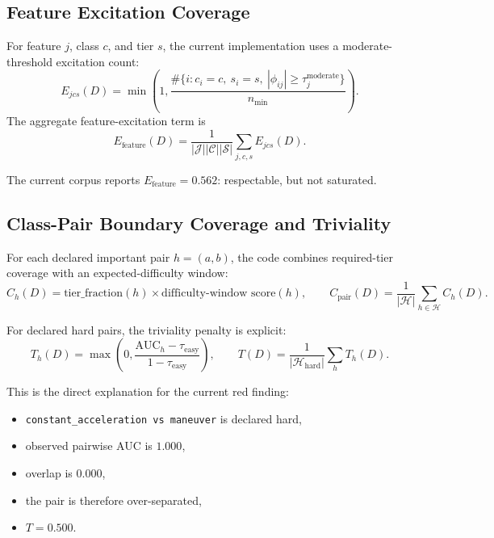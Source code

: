 \documentclass[11pt]{article}
\begin{document}
\subsection{Feature Excitation Coverage}

For feature \(j\), class \(c\), and tier \(s\), the current implementation uses
a moderate-threshold excitation count:
\begin{equation}
    E_{jcs}(D)
    =
    \min\left(
    1,
    \frac{
    \#\{i : c_i=c,\ s_i=s,\ |\phi_{ij}| \ge \tau^{\text{moderate}}_j\}
    }{n_{\min}}
    \right).
\end{equation}
The aggregate feature-excitation term is
\begin{equation}
    E_{\text{feature}}(D)
    =
    \frac{1}{|\mathcal{J}||\mathcal{C}||\mathcal{S}|}
    \sum_{j,c,s} E_{jcs}(D).
\end{equation}

The current corpus reports \(E_{\text{feature}} = 0.562\): respectable, but
not saturated.

\subsection{Class-Pair Boundary Coverage and Triviality}

For each declared important pair \(h=(a,b)\), the code combines required-tier
coverage with an expected-difficulty window:
\begin{equation}
    C_h(D)
    =
    \text{tier\_fraction}(h)
    \times
    \text{difficulty-window score}(h),
    \qquad
    C_{\text{pair}}(D)
    =
    \frac{1}{|\mathcal{H}|}\sum_{h\in\mathcal{H}} C_h(D).
\end{equation}

For declared hard pairs, the triviality penalty is explicit:
\begin{equation}
    T_h(D)
    =
    \max\left(
    0,
    \frac{\mathrm{AUC}_h-\tau_{\text{easy}}}{1-\tau_{\text{easy}}}
    \right),
    \qquad
    T(D)=\frac{1}{|\mathcal{H}_{\text{hard}}|}\sum_h T_h(D).
\end{equation}

This is the direct explanation for the current red finding:
\begin{itemize}[leftmargin=1.5em]
    \item \texttt{constant\_acceleration vs maneuver} is declared hard,
    \item observed pairwise AUC is \(1.000\),
    \item overlap is \(0.000\),
    \item the pair is therefore over-separated,
    \item \(T = 0.500\).
\end{itemize}
\end{document}

